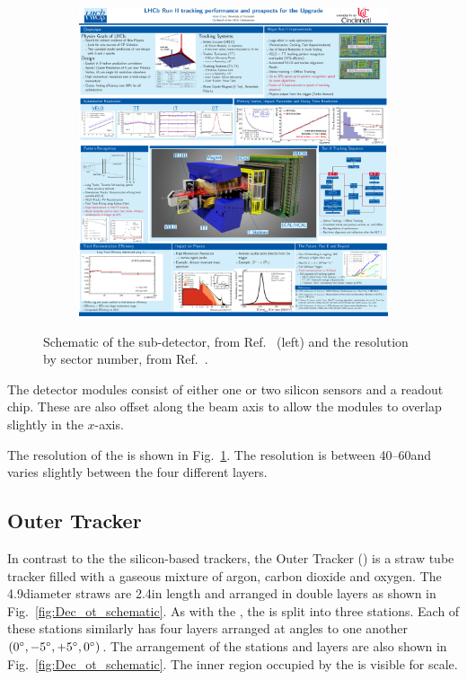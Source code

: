 \begin{figure}[!h]
\begin{subfigure}[m]{0.49\textwidth}
        \includegraphics[width=1.0\textwidth]{figs/Detector/it_resolution.pdf}
    \end{subfigure}
    \caption{Schematic of the \intr sub-detector, from Ref.~\cite{Alves:2008zz} (left) and the \intr resolution by sector number, from Ref.~\cite{LHCb-DP-2014-002}.}
    \label{fig:Dec_it_scematic}   
\end{figure}



The detector modules consist of either one or two silicon sensors and a readout chip. These are also offset along the beam axis to allow the modules to overlap slightly in the $x$-axis.

The resolution of the \intr is shown in Fig.~\ref{fig:Dec_it_scematic}. The resolution is between 40--60\mum and varies slightly between the four different layers.    



\subsection{Outer Tracker}

In contrast to the the silicon-based trackers, the Outer Tracker (\ot) is a straw tube tracker filled with a gaseous mixture of argon, carbon dioxide and oxygen. The 4.9\mm diameter straws are 2.4\m in length and arranged in double layers as shown in Fig.~\ref{fig:Dec_ot_schematic}. As with the \intr, the \ot is split into three stations. Each of these stations similarly has four layers arranged at angles to one another $(0^{\circ},-5^{\circ},+5^{\circ},0^{\circ})$. The arrangement of the stations and layers are also shown in Fig.~\ref{fig:Dec_ot_schematic}. The inner region occupied by the \intr is visible for scale.

